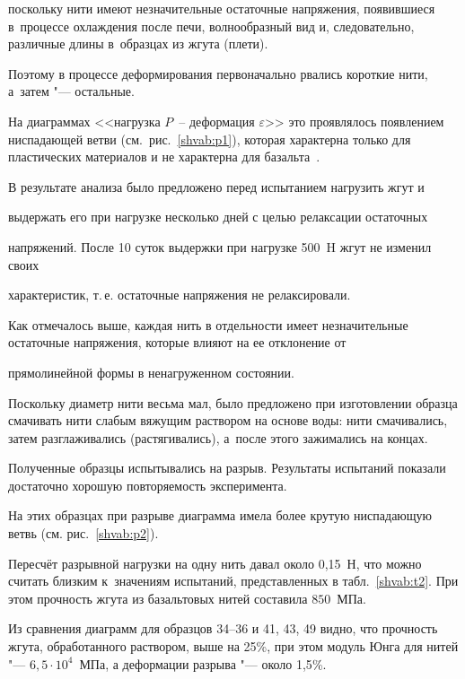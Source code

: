 поскольку нити имеют незначительные остаточные напряжения, появившиеся в~процессе охлаждения после печи, волнообразный вид и, следовательно, различные длины в~образцах из жгута (плети). 

Поэтому в процессе деформирования первоначально рвались короткие нити, а~затем "--- остальные. 

На диаграммах <<нагрузка $P$~-- деформация $\varepsilon$>> это проявлялось появлением ниспадающей ветви (см.~рис.~\ref{shvab:p1}), которая характерна только для пластических материалов и не характерна для базальта~\cite{demeshkin:bib1}. 





В результате анализа было предложено перед испытанием нагрузить жгут и

выдержать его при нагрузке несколько дней с целью релаксации остаточных

напряжений. После 10 суток выдержки при нагрузке 500~H жгут не изменил своих

характеристик, т.\,е. остаточные напряжения не релаксировали.



Как отмечалось выше, каждая нить в отдельности имеет незначительные остаточные напряжения, которые влияют на ее отклонение от

прямолинейной формы в ненагруженном состоянии. 

Поскольку диаметр нити весьма мал, было предложено при изготовлении образца смачивать нити слабым вяжущим раствором на основе воды: нити смачивались, затем разглаживались (растягивались), а~после этого зажимались на концах. 

Полученные образцы испытывались на разрыв. Результаты испытаний показали достаточно хорошую повторяемость эксперимента. 

На этих образцах при разрыве диаграмма имела более крутую ниспадающую ветвь (см. рис.~\ref{shvab:p2}). 

Пересчёт разрывной нагрузки на одну нить давал около 0,15~Н, что можно считать близким к~значениям испытаний, представленных в табл.~\ref{shvab:t2}. При этом прочность жгута из базальтовых нитей составила $850$~МПа. 

Из сравнения диаграмм для образцов 34--36 и 41, 43, 49 видно, что прочность жгута, обработанного раствором, выше на 25{\%}, при этом модуль Юнга для нитей "--- $6,5\cdot  10^4$~МПа, а деформации разрыва "--- около 1,5{\%}.



